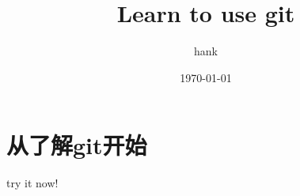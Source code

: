 \documentclass[12pt]{article}
\title{Learn to use git}
\author{hank}
\date{\today}
\begin{document}
\maketitle
\section{从了解git开始}
try it now!
\end{document}
